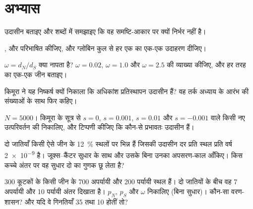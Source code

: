 \section{अभ्यास}

\begin{exercise}[$\star$]\label{exo:b3:molecular-evolution:1}
उदासीन  बताइए और शब्दों में समझाइए कि वह समष्टि-आकार पर
क्यों निर्भर नहीं है।
\end{exercise}

\begin{exercise}[$\star$]\label{exo:b3:molecular-evolution:2}
,  और  परिभाषित कीजिए, और ग्लोबिन कुल से हर एक
का एक-एक उदाहरण दीजिए।
\end{exercise}

\begin{exercise}[$\star$]\label{exo:b3:molecular-evolution:3}
$\omega = d_{N}/d_{S}$ क्या नापता है? $\omega = 0.02$,
$\omega = 1.0$ और $\omega = 2.5$ की व्याख्या कीजिए, और हर तरह का एक-एक
जीन बताइए।
\end{exercise}

\begin{exercise}[$\star$]\label{exo:b3:molecular-evolution:4}
किमूरा ने यह निष्कर्ष क्यों निकाला कि अधिकांश प्रतिस्थापन उदासीन हैं?
वह तर्क अध्याय के आरंभ की संख्याओं के साथ फिर कहिए।
\end{exercise}

\begin{exercise}[$\star\star$]\label{exo:b3:molecular-evolution:5}
$N = 5000$। किमूरा के सूत्र से $s
= 0$, $s = 0.001$, $s = 0.01$ और $s = -0.001$ वाले किसी नए उत्परिवर्तन
की  निकालिए, और टिप्पणी कीजिए कि कौन-से प्रभावतः उदासीन
हैं।
\end{exercise}

\begin{exercise}[$\star\star$]\label{exo:b3:molecular-evolution:6}
दो जातियाँ किसी ऐसे जीन के \qty{12}{\%} स्थलों पर भिन्न हैं जिसकी
उदासीन दर प्रति स्थल प्रति वर्ष \qty{2e-9}{} है। जूक्स--कैंटर सुधार के
साथ और उसके बिना उनका अपसरण-काल आँकिए। किस कच्चे अंतर पर वह सुधार दो का
गुणक छू लेता है?
\end{exercise}

\begin{exercise}[$\star\star$]\label{exo:b3:molecular-evolution:7}
300 कूटकों के किसी जीन के 700 अपर्यायी और 200 पर्यायी स्थल हैं। दो
जातियों के बीच वह 7 अपर्यायी और 10 पर्यायी अंतर दिखाता है। $p_{N}$,
$p_{S}$ और $\omega$ निकालिए (बिना सुधार)। कौन-सा वरण-शासन? और यदि वे
गिनतियाँ 35 तथा 10 होतीं तो?
\end{exercise}

